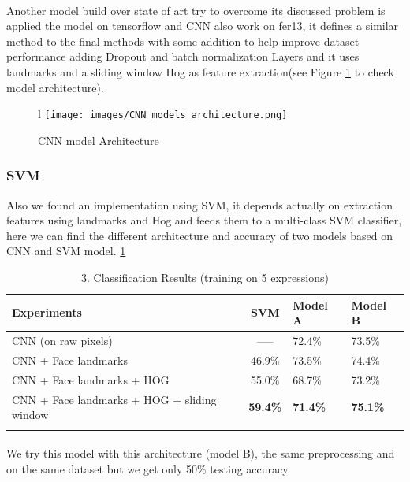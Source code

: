 \paragraph{}
Another model build over state of art try to overcome its discussed problem is applied the model on tensorflow and CNN also work on fer13, it defines a similar method to the final methods with some addition to help improve dataset performance adding Dropout and batch normalization Layers and it uses landmarks and a sliding window Hog as feature extraction(see Figure \ref{amine_arch} to check model architecture). \newline 
\begin{figure}{l}
	\centering
	\texttt{[image: images/CNN\_models\_architecture.png]}
	\caption{CNN model Architecture}
	\label{amine_arch}
\end{figure}
\subsubsection{SVM}
Also we found an implementation using SVM, it depends actually on extraction features using landmarks and Hog and feeds them to a multi-class SVM classifier, here we can find the different architecture and accuracy of two models based on CNN and SVM model. \ref{amine}

\begin{table}[h!]
	\begin{center}
		\caption{3. Classification Results (training on 5 expressions)\newline}
		\label{amine}
		\begin{tabular}{l|c|l|l}
			\textbf{Experiments} & \textbf{SVM}   & \textbf{Model A}   & \textbf{Model B}  \\
			\hline
			CNN (on raw pixels)	& -----   & 72.4\% & 73.5\% \\ 
			CNN + Face landmarks & 46.9\% &	73.5\% & 74.4\% \\
			CNN + Face landmarks + HOG & 55.0\% & 68.7\% & 73.2\% \\
			CNN + Face landmarks + HOG + sliding window & \textbf{59.4\%} &\textbf{71.4\%}&\textbf{75.1\%}\\
			& & 
		\end{tabular}
		
	\end{center}
\end{table}


\paragraph{} We try this model with this architecture (model B), the same preprocessing and on the same dataset but we get only 50\% testing accuracy.

